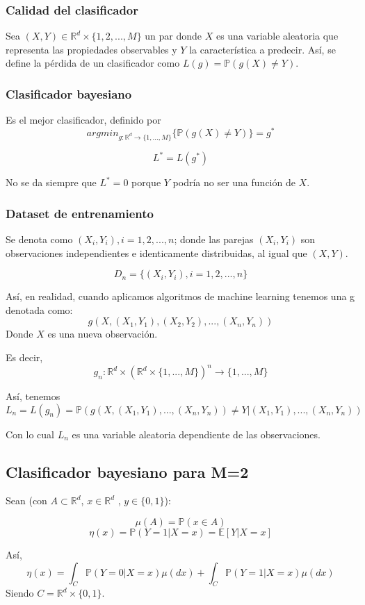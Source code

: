 \documentclass[12pt, a4paper]{article}
\begin{document}
\subsubsection{Calidad del clasificador}
Sea $(X,Y) \in \mathds{R}^d \times \{1,2, ..., M \}$ un par donde $X$ es una variable aleatoria que representa las propiedades observables y $Y$ la característica a predecir. Así, se define la pérdida de un clasificador como 
$L(g) = \mathds{P} ( g(X) \neq Y )$.
\subsubsection{Clasificador bayesiano}
Es el mejor clasificador, definido por
$$ argmin_{g:\mathds{R}^d \rightarrow \{1, ..., M\}}\{\mathds{P}( g(X) \neq Y )\} = g^{*}$$

$$L^{*}=L(g^{*})$$

No se da siempre que $L^{*}=0$ porque $Y$ podría no ser una función de $X$.

\subsubsection{Dataset de entrenamiento}
Se denota como $(X_i,Y_i), i = 1, 2, ..., n$; donde las parejas $(X_i,Y_i)$ son observaciones independientes e identicamente distribuidas, al igual que $(X,Y)$.

$$ D_n = \{(X_i,Y_i), i = 1, 2, ..., n\} $$

Así, en realidad, cuando aplicamos algoritmos de machine learning tenemos una g denotada como:
$$g(X,(X_1,Y_1), (X_2,Y_2), ..., (X_n,Y_n))$$
Donde $X$ es una nueva observación.

Es decir,
$$g_n:\mathds{R}^d \times ( \mathds{R}^d \times \{ 1, ..., M \})^n \rightarrow \{1,...,M\}$$

Así, tenemos $$L_n=L(g_n) = \mathds{P} ( g(X,(X_1,Y_1), ..., (X_n,Y_n)) \neq Y | (X_1,Y_1), ..., (X_n,Y_n))$$

Con lo cual $L_n$ es una variable aleatoria dependiente de las observaciones.
\subsection{Clasificador bayesiano para M=2}

Sean (con $A \subset \mathds{R}^d$, $x \in \mathds{R}^d$ , $y\in \{0,1\}$):

$$\mu(A)=\mathds{P}(x \in A)$$
$$\eta(x)=\mathds{P}(Y=1 | X=x)=\mathds{E}[Y|X=x]$$

Así, $$\eta(x)=\int_{C}\mathds{P}(Y=0|X=x) \mu(dx) + \int_{C}\mathds{P}(Y=1|X=x) \mu(dx)$$
Siendo $C=\mathds{R}^d \times \{0,1\}$.
\end{document}
